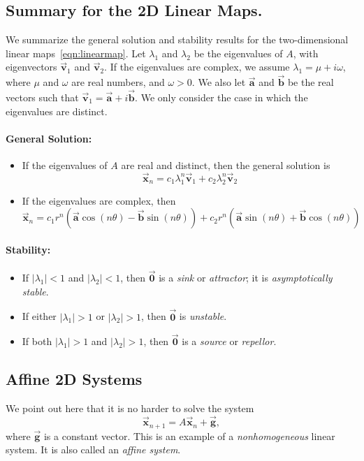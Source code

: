 \documentclass[reqno]{immbook}
\newcommand{\BA}{\vec{\textbf{a}}}
\newcommand{\BB}{\vec{\textbf{b}}}
\newcommand{\BG}{\vec{\textbf{g}}}
\newcommand{\BV}{\vec{\textbf{v}}}
\newcommand{\BX}{\vec{\textbf{x}}}
\newcommand{\BZ}{\vec{\textbf{0}}}  %
\begin{document}
\subsection*{Summary for the 2D Linear Maps.}
We summarize the general solution and stability results
for the two-dimensional linear maps~\eqref{eqn:linearmap}.
Let $\lambda_1$ and $\lambda_2$ be the eigenvalues of
$A$, with eigenvectors $\BV_1$ and $\BV_2$.
If the eigenvalues are complex, we assume
$\lambda_1 = \mu+i\omega$, where $\mu$ and $\omega$
are real numbers, and $\omega > 0$.  We also let $\BA$ and $\BB$
be the real vectors such that $\BV_1 = \BA+i\BB$.
We only consider the case in which the eigenvalues are distinct. 

\paragraph{General Solution:}
\begin{itemize}
\item If the eigenvalues of $A$ are real and distinct, then the
general solution is
\begin{equation}
   \BX_n = c_1 \lambda_1^n \BV_1 + c_2 \lambda_2^n \BV_2
\end{equation}
\item If the eigenvalues are complex, then
\begin{equation}
  \BX_n =    c_1 r^n(\BA\cos(n\theta)-\BB\sin(n\theta))
           + c_2 r^n(\BA\sin(n\theta)+\BB\cos(n\theta))
\end{equation}
\end{itemize}
\paragraph{Stability:}
\begin{itemize}
\item If $|\lambda_1| < 1$ and $|\lambda_2| < 1$, then
$\BZ$ is a \emph{sink} or \emph{attractor}; it is
\emph{asymptotically stable}.
\item If either $|\lambda_1| > 1$ or $|\lambda_2|>1$, then
$\BZ$ is \emph{unstable}.
\item If both $|\lambda_1| > 1$ and $|\lambda_2|>1$, then
$\BZ$ is a \emph{source} or \emph{repellor}.
\end{itemize}

\subsection*{Affine 2D Systems}
We point out here that it is no harder to solve the
system
\begin{equation}
  \BX_{n+1} = A\BX_n + \BG,
  \label{eqn:affine}
\end{equation}
where $\BG$ is a constant vector.
This is an example of a \emph{nonhomogeneous}
linear system.  It is also called an \emph{affine system}.
\end{document}
